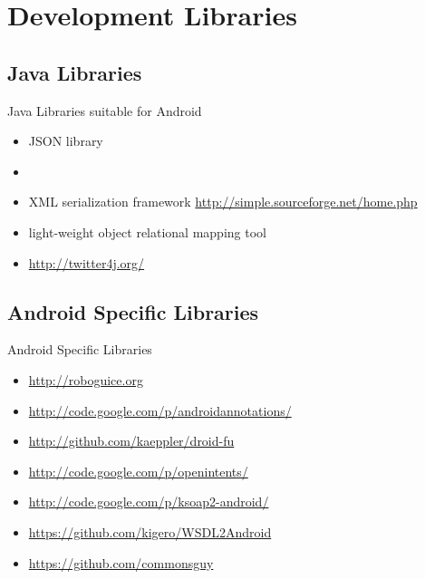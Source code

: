 \documentclass[aspectratio=169]{beamer}
\newcommand{\surl}[1] {{\tiny \url{#1}}}
\begin{document}
\section{Development Libraries}

  \subsection{Java Libraries}

    \begin{frame}{Java Libraries suitable for Android}
      \begin{itemize}
        \item<1->[jackson] JSON library 
        \item<2->[gson] 
        
        \item<3->[SimpleXML] XML serialization framework \surl{http://simple.sourceforge.net/home.php}

        \item<4->[ormlite] light-weight object relational mapping tool \surl{}

        \item<5->[Twitter4J] \surl{http://twitter4j.org/}

        
      \end{itemize}
    \end{frame}

  \subsection{Android Specific Libraries}

    \begin{frame}{Android Specific Libraries}
      \begin{itemize}
        \item<1->[Roboguice] \surl{http://roboguice.org} 
        \item<2->[AndroidAnnotations] \surl{http://code.google.com/p/androidannotations/}
        \item<3->[DroidFu] \surl{http://github.com/kaeppler/droid-fu}
        \item<4->[OpenIntents] \surl{http://code.google.com/p/openintents/}
        \item<6->[ksoap2-android] \surl{http://code.google.com/p/ksoap2-android/}
        \item<7->[WSDL2Android] \surl{https://github.com/kigero/WSDL2Android}
        \item<8->[CommonsWare Android Components CWAC] \surl{https://github.com/commonsguy}
    \end{itemize}
    \end{frame}
  
\end{document}

